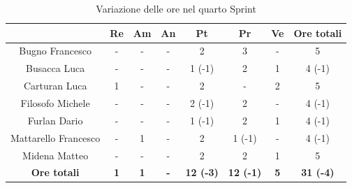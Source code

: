 \begin{table}[H]
  \centering
  \renewcommand{\arraystretch}{1.8}
  \begin{tabular}{c|c|c|c|c|c|c|c}
    \rowcolor[HTML]{125E28}
    \multicolumn{1}{c}{\color[HTML]{FFFFFF}\textbf{ Nominativo }}
                         & \multicolumn{1}{c}{\color[HTML]{FFFFFF}\textbf{ Re }}
                         & \multicolumn{1}{c}{\color[HTML]{FFFFFF}\textbf{ Am}}
                         & \multicolumn{1}{c}{\color[HTML]{FFFFFF}\textbf{ An }}
                         & \multicolumn{1}{c}{\color[HTML]{FFFFFF}\textbf{ Pt }}
                         & \multicolumn{1}{c}{\color[HTML]{FFFFFF}\textbf{ Pr }}
                         & \multicolumn{1}{c}{\color[HTML]{FFFFFF}\textbf{ Ve }}
                         & \multicolumn{1}{c}{\color[HTML]{FFFFFF}\textbf{ Ore totali }}                                                                                                 \\
    \hline
    Bugno Francesco      & -                                                             & -          & -          & 2                & 3                & -          & 5                \\
    Busacca Luca         & -                                                             & -          & -          & 1 (-1)           & 2                & 1          & 4 (-1)           \\
    Carturan Luca        & 1                                                             & -          & -          & 2                & -                & 2          & 5                \\
    Filosofo Michele     & -                                                             & -          & -          & 2 (-1)           & 2                & -          & 4 (-1)           \\
    Furlan Dario         & -                                                             & -          & -          & 1 (-1)           & 2                & 1          & 4 (-1)           \\
    Mattarello Francesco & -                                                             & 1          & -          & 2                & 1 (-1)           & -          & 4 (-1)           \\
    Midena Matteo        & -                                                             & -          & -          & 2                & 2                & 1          & 5                \\
    \textbf{Ore totali}  & \textbf{1}                                                    & \textbf{1} & \textbf{-} & \textbf{12 (-3)} & \textbf{12 (-1)} & \textbf{5} & \textbf{31 (-4)}
  \end{tabular}
  \caption{Variazione delle ore nel quarto Sprint}
\end{table}

